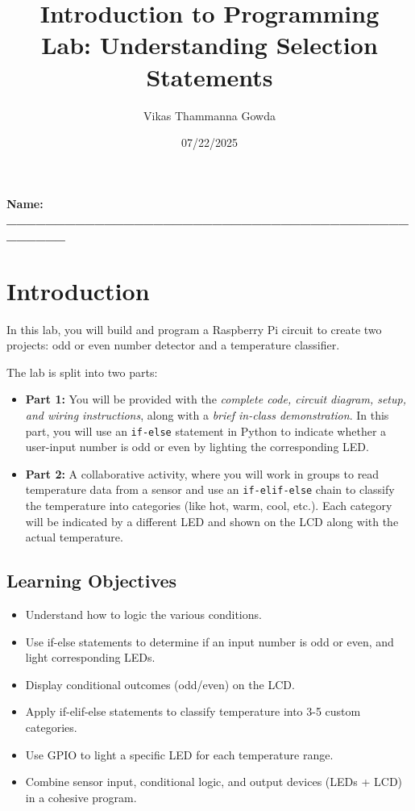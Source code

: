 \documentclass[a4paper,11pt]{article}
\title{Introduction to Programming \\ Lab: Understanding Selection Statements}
\author{Vikas Thammanna Gowda}
\date{07/22/2025}
\begin{document}
\maketitle

\noindent \textbf{Name: \_\_\_\_\_\_\_\_\_\_\_\_\_\_\_\_\_\_\_\_\_\_\_\_\_\_\_\_\_\_\_\_\_\_\_\_\_\_\_\_\_\_\_\_\_\_\_}
\section*{Introduction}
In this lab, you will build and program a Raspberry Pi circuit to create two 
projects: odd or even number detector and a temperature classifier.

The lab is split into two parts: 
\begin{itemize}
\item \textbf{Part 1:} You will be provided with the \textit{complete code, circuit diagram, setup, 
and wiring instructions}, along with a \textit{brief in-class demonstration}. 
In this part, you will use an \texttt{if-else} statement in Python to indicate 
whether a user-input number is odd or even by lighting the corresponding LED.

\item \textbf{Part 2:} A collaborative activity, where you will work in groups to 
read temperature data from a sensor and use an \texttt{if-elif-else} chain to classify 
the temperature into categories (like hot, warm, cool, etc.). 
Each category will be indicated by a different LED and 
shown on the LCD along with the actual temperature.

\end{itemize} 

\subsection*{Learning Objectives}
\begin{itemize}
    \item Understand how to logic the various conditions.
    \item Use if-else statements to determine if an input number is odd or even, and light corresponding LEDs.

\item Display conditional outcomes (odd/even) on the LCD.

\item Apply if-elif-else statements to classify temperature into 3-5 custom categories.

\item Use GPIO to light a specific LED for each temperature range.

\item Combine sensor input, conditional logic, and output devices (LEDs + LCD) in a cohesive program.

\end{itemize}
\end{document}
